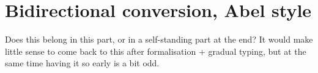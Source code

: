 \chapter{Bidirectional conversion, Abel style}
\label{chap:bidir-conv}

Does this belong in this part, or in a self-standing part at the end?
It would make little sense to come back to this after formalisation + gradual typing,
but at the same time having it so early is a bit odd.
